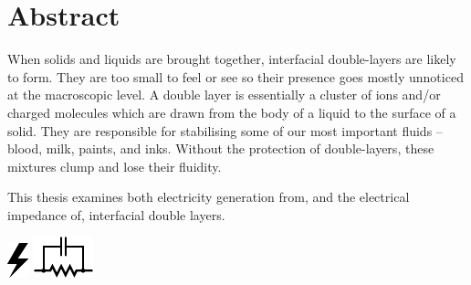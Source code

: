 





\rmfamily






\onehalfspacing
\chapter*{Abstract}
  When solids and liquids are brought together, interfacial double-layers are likely to form.
  They are too small to feel or see so their presence goes mostly unnoticed at the macroscopic level.
  A double layer is essentially a cluster of ions and/or charged molecules which are drawn from the body of a liquid to the surface of a solid.
  They are responsible for stabilising some of our most important fluids -- blood, milk, paints, and inks.
  Without the protection of double-layers, these mixtures clump and lose their fluidity.

  \vspace{-0.3cm}
  \begin{center}
    \parbox{8.8cm}{
      \begin{center}
        This thesis examines both electricity generation from, and the electrical impedance of, interfacial double layers.
      \end{center}
      \vspace{-1.35cm}
    }
    \vspace{-0.3cm}
    \parbox{15cm}{
        \hspace{0.8cm}
        \hbox{\vspace{-0.9cm}\includegraphics{graphics/logo_electricity}}
        \hbox{\hspace{9.8cm}\includegraphics{graphics/logo_impedance}}
    }
  \end{center}
  \vspace{0.5cm}


